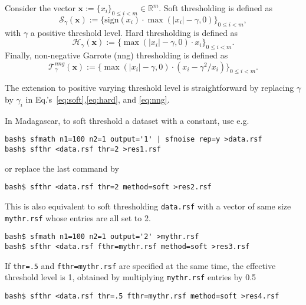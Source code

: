 \noindent\doublebox{\parbox{\textwidth}{

}}

\noindent
Consider the vector $\mathbf{x}:=\{x_i\}_{0\leq i <m}\in\mathbb{R}^m$.
Soft thresholding is defined as
%
\begin{equation}
\label{eq:soft}
\mathcal{S}_\gamma(\mathbf{x}):=\{\mbox{sign}(x_i)\cdot
\max(|x_i|-\gamma,0)\}_{0\leq i <m},
\end{equation}
%
with $\gamma$ a positive threshold level. Hard thresholding is defined
as
%
\begin{equation}
\label{eq:hard}
\mathcal{H}_\gamma(\mathbf{x}):=\{\max(|x_i|-\gamma,0)\cdot x_i\}_{0\leq i <m}.
\end{equation}
%
Finally, non-negative Garrote (nng) thresholding is defined as
%
\begin{equation}
\label{eq:nng}
\mathcal{T}^{nng}_\gamma(\mathbf{x}):=\{\max(|x_i|-\gamma,0)\cdot 
(x_i-\gamma^2/x_i)\}_{0\leq i <m}.
\end{equation}


The extension to positive varying threshold level is straightforward
by replacing $\gamma$ by $\gamma_i$ in
Eq.'s~\eqref{eq:soft},\eqref{eq:hard}, and \eqref{eq:nng}.

In Madagascar, to soft threshold a dataset with a constant, use e.g.
%
\begin{verbatim}
bash$ sfmath n1=100 n2=1 output='1' | sfnoise rep=y >data.rsf
bash$ sfthr <data.rsf thr=2 >res1.rsf
\end{verbatim}
%
or replace the last command by
%
\begin{verbatim}
bash$ sfthr <data.rsf thr=2 method=soft >res2.rsf
\end{verbatim}
%
This is also equivalent to soft thresholding \texttt{data.rsf} with a
vector of same size \texttt{mythr.rsf} whose entries are all set to 2.
%
\begin{verbatim}
bash$ sfmath n1=100 n2=1 output='2' >mythr.rsf
bash$ sfthr <data.rsf fthr=mythr.rsf method=soft >res3.rsf
\end{verbatim}
%
If \texttt{thr=.5} and \texttt{fthr=mythr.rsf} are specified at the
same time, the effective threshold level is 1, obtained by multiplying
\texttt{mythr.rsf} entries by 0.5
%
\begin{verbatim}
bash$ sfthr <data.rsf thr=.5 fthr=mythr.rsf method=soft >res4.rsf
\end{verbatim}

